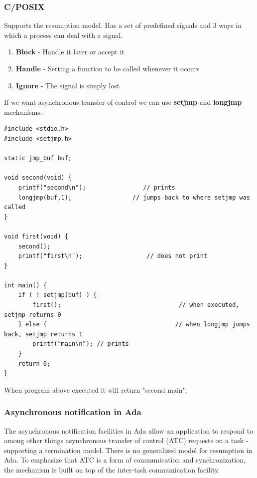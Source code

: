 \subsubsection{C/POSIX}
Supports the resumption model. Has a set of predefined signals and 3 ways in which a process can deal with a signal. 
\begin{enumerate}
\item \textbf{Block} - Handle it later or accept it
\item \textbf{Handle} - Setting a function to be called whenever it occurs
\item \textbf{Ignore} - The signal is simply lost
\end{enumerate}
If we want asynchronous transfer of control we can use \textbf{setjmp} and \textbf{longjmp} mechanisms. 
\begin{verbatim}
#include <stdio.h>
#include <setjmp.h>

static jmp_buf buf;

void second(void) {
    printf("second\n");			 	   // prints
    longjmp(buf,1); 				// jumps back to where setjmp was called
}

void first(void) {
    second();
    printf("first\n"); 					// does not print
}

int main() {
    if ( ! setjmp(buf) ) {
        first(); 								 // when executed, setjmp returns 0
    } else { 									// when longjmp jumps back, setjmp returns 1
        printf("main\n"); // prints
    }
    return 0;
}
\end{verbatim}
When program above executed it will return "second main".

\subsubsection{Asynchronous notification in Ada}
The asynchronous notification facilities in Ada allow an application to respond to among other things asynchronous transfer of control (ATC) requests on a task - supporting a termination model. There is no generalized model for resumption in Ada. To emphasize that ATC is a form of communication and synchronization, the mechanism  is built on top of the inter-task communication facility.


